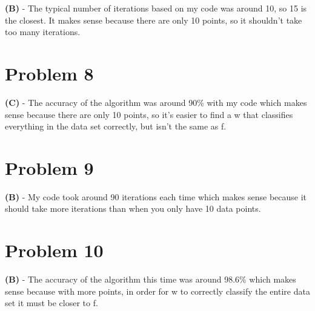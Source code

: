 \documentclass[10pt,letter]{article}
\begin{document}
\textbf{(B)} - The typical number of iterations based on my code was around 10, so 15 is the closest. It makes sense because there are only 10 points, so it shouldn't take too many iterations.

\section*{Problem 8}

\textbf{(C)} - The accuracy of the algorithm was around 90\%  with my code which makes sense because there are only 10 points, so it's easier to find a w that classifies everything in the data set correctly, but isn't the same as f.

\section*{Problem 9}

\textbf{(B)} - My code took around 90 iterations each time which makes sense because it should take more iterations than when you only have 10 data points.

\section*{Problem 10}

\textbf{(B)} - The accuracy of the algorithm this time was around 98.6\% which makes sense because with more points, in order for w to correctly classify the entire data set it must be closer to f.
\end{document}
